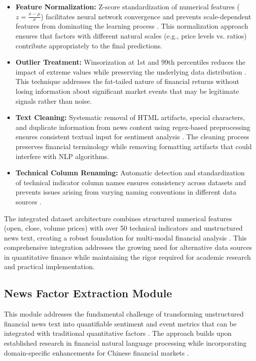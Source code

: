 \documentclass[3p,times,procedia]{elsarticle}
\begin{document}
\begin{itemize}
\begin{itemize}
\item \textbf{Feature Normalization:} Z-score standardization of numerical features ($z = \frac{x - \mu}{\sigma}$) facilitates neural network convergence and prevents scale-dependent features from dominating the learning process \cite{Fischer2018}. This normalization approach ensures that factors with different natural scales (e.g., price levels vs. ratios) contribute appropriately to the final predictions.

\item \textbf{Outlier Treatment:} Winsorization at 1st and 99th percentiles reduces the impact of extreme values while preserving the underlying data distribution \cite{Harvey2016}. This technique addresses the fat-tailed nature of financial returns without losing information about significant market events that may be legitimate signals rather than noise.

\item \textbf{Text Cleaning:} Systematic removal of HTML artifacts, special characters, and duplicate information from news content using regex-based preprocessing ensures consistent textual input for sentiment analysis \cite{Loughran2011}. The cleaning process preserves financial terminology while removing formatting artifacts that could interfere with NLP algorithms.

\item \textbf{Technical Column Renaming:} Automatic detection and standardization of technical indicator column names ensures consistency across datasets and prevents issues arising from varying naming conventions in different data sources \cite{Murphy1999}.
\end{itemize}
\end{itemize}

The integrated dataset architecture combines structured numerical features (open, close, volume prices) with over 50 technical indicators and unstructured news text, creating a robust foundation for multi-modal financial analysis \cite{FinReportDataset2025}. This comprehensive integration addresses the growing need for alternative data sources in quantitative finance \cite{Harvey2016} while maintaining the rigor required for academic research and practical implementation.

\subsection{{News Factor Extraction Module}}

This module addresses the fundamental challenge of transforming unstructured financial news text into quantifiable sentiment and event metrics that can be integrated with traditional quantitative factors \cite{TETLOCK2007,Schumaker2009}. The approach builds upon established research in financial natural language processing while incorporating domain-specific enhancements for Chinese financial markets \cite{Xing2018,Loughran2011}.
\end{document}
